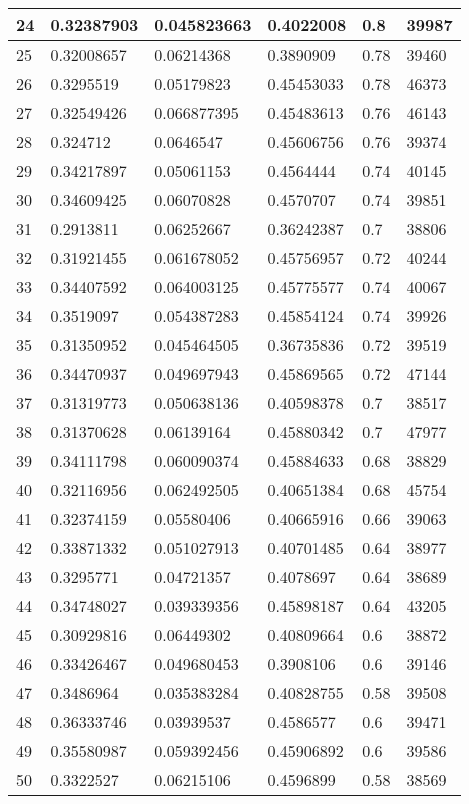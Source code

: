 \begin{longtable}{|l|l|l|l|l|l|}
24 & 0.32387903 & 0.045823663 & 0.4022008 & 0.8 & 39987 \\ \hline 
25 & 0.32008657 & 0.06214368 & 0.3890909 & 0.78 & 39460 \\ \hline 
26 & 0.3295519 & 0.05179823 & 0.45453033 & 0.78 & 46373 \\ \hline 
27 & 0.32549426 & 0.066877395 & 0.45483613 & 0.76 & 46143 \\ \hline 
28 & 0.324712 & 0.0646547 & 0.45606756 & 0.76 & 39374 \\ \hline 
29 & 0.34217897 & 0.05061153 & 0.4564444 & 0.74 & 40145 \\ \hline 
30 & 0.34609425 & 0.06070828 & 0.4570707 & 0.74 & 39851 \\ \hline 
31 & 0.2913811 & 0.06252667 & 0.36242387 & 0.7 & 38806 \\ \hline 
32 & 0.31921455 & 0.061678052 & 0.45756957 & 0.72 & 40244 \\ \hline 
33 & 0.34407592 & 0.064003125 & 0.45775577 & 0.74 & 40067 \\ \hline 
34 & 0.3519097 & 0.054387283 & 0.45854124 & 0.74 & 39926 \\ \hline 
35 & 0.31350952 & 0.045464505 & 0.36735836 & 0.72 & 39519 \\ \hline 
36 & 0.34470937 & 0.049697943 & 0.45869565 & 0.72 & 47144 \\ \hline 
37 & 0.31319773 & 0.050638136 & 0.40598378 & 0.7 & 38517 \\ \hline 
38 & 0.31370628 & 0.06139164 & 0.45880342 & 0.7 & 47977 \\ \hline 
39 & 0.34111798 & 0.060090374 & 0.45884633 & 0.68 & 38829 \\ \hline 
40 & 0.32116956 & 0.062492505 & 0.40651384 & 0.68 & 45754 \\ \hline 
41 & 0.32374159 & 0.05580406 & 0.40665916 & 0.66 & 39063 \\ \hline 
42 & 0.33871332 & 0.051027913 & 0.40701485 & 0.64 & 38977 \\ \hline 
43 & 0.3295771 & 0.04721357 & 0.4078697 & 0.64 & 38689 \\ \hline 
44 & 0.34748027 & 0.039339356 & 0.45898187 & 0.64 & 43205 \\ \hline 
45 & 0.30929816 & 0.06449302 & 0.40809664 & 0.6 & 38872 \\ \hline 
46 & 0.33426467 & 0.049680453 & 0.3908106 & 0.6 & 39146 \\ \hline 
47 & 0.3486964 & 0.035383284 & 0.40828755 & 0.58 & 39508 \\ \hline 
48 & 0.36333746 & 0.03939537 & 0.4586577 & 0.6 & 39471 \\ \hline 
49 & 0.35580987 & 0.059392456 & 0.45906892 & 0.6 & 39586 \\ \hline 
50 & 0.3322527 & 0.06215106 & 0.4596899 & 0.58 & 38569 \\ \hline 
\end{longtable}
